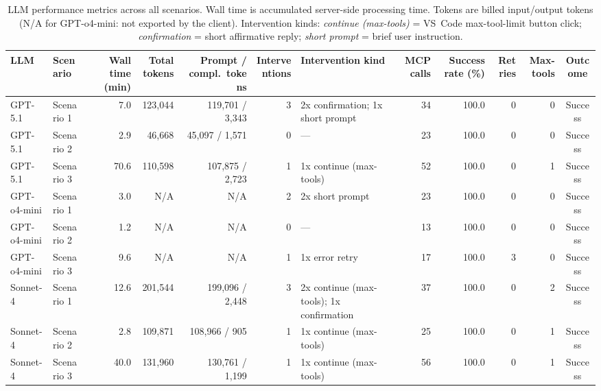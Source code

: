 \begin{table}[htbp]
\centering
\caption{LLM performance metrics across all scenarios. Wall time is accumulated server-side processing time. Tokens are billed input/output tokens (N/A for GPT-o4-mini: not exported by the client). Intervention kinds: \textit{continue (max-tools)} = VS~Code max-tool-limit button click; \textit{confirmation} = short affirmative reply; \textit{short prompt} = brief user instruction.}
\label{tab:llm_performance_metrics}
\small
\begin{tabular}{llrrrrlrrrrc}
\toprule
LLM & Scenario & Wall time (min) & Total tokens & Prompt / compl.\ tokens & Interventions & Intervention kind & MCP calls & Success rate (\%) & Retries & Max-tools & Outcome \\
\midrule
GPT-5.1 & Scenario 1 & 7.0 & 123,044 & 119,701 / 3,343 & 3 & 2x confirmation; 1x short prompt & 34 & 100.0 & 0 & 0 & Success \\
GPT-5.1 & Scenario 2 & 2.9 & 46,668 & 45,097 / 1,571 & 0 & — & 23 & 100.0 & 0 & 0 & Success \\
GPT-5.1 & Scenario 3 & 70.6 & 110,598 & 107,875 / 2,723 & 1 & 1x continue (max-tools) & 52 & 100.0 & 0 & 1 & Success \\
\midrule
GPT-o4-mini & Scenario 1 & 3.0 & N/A & N/A & 2 & 2x short prompt & 23 & 100.0 & 0 & 0 & Success \\
GPT-o4-mini & Scenario 2 & 1.2 & N/A & N/A & 0 & — & 13 & 100.0 & 0 & 0 & Success \\
GPT-o4-mini & Scenario 3 & 9.6 & N/A & N/A & 1 & 1x error retry & 17 & 100.0 & 3 & 0 & Success \\
\midrule
Sonnet-4 & Scenario 1 & 12.6 & 201,544 & 199,096 / 2,448 & 3 & 2x continue (max-tools); 1x confirmation & 37 & 100.0 & 0 & 2 & Success \\
Sonnet-4 & Scenario 2 & 2.8 & 109,871 & 108,966 / 905 & 1 & 1x continue (max-tools) & 25 & 100.0 & 0 & 1 & Success \\
Sonnet-4 & Scenario 3 & 40.0 & 131,960 & 130,761 / 1,199 & 1 & 1x continue (max-tools) & 56 & 100.0 & 0 & 1 & Success \\
\bottomrule
\end{tabular}
\end{table}
